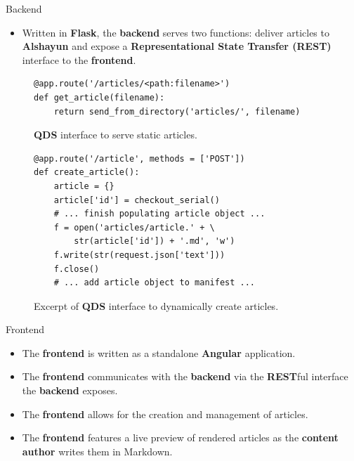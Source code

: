 \documentclass{beamer}
\begin{document}
\begin{frame}{Backend}
    \begin{itemize}
        \item Written in \textbf{Flask}, the \textbf{backend} serves two
            functions: deliver articles to \textbf{Alshayun} and expose a
            \textbf{Representational State Transfer (REST)} interface to the
            \textbf{frontend}.
    \end{itemize}
    \begin{figure}
    \begin{verbatim}
@app.route('/articles/<path:filename>')
def get_article(filename):
    return send_from_directory('articles/', filename)
    \end{verbatim}
    \caption{\textbf{QDS} interface to serve static articles.}
    \end{figure}
    \begin{figure}
    \begin{verbatim}
@app.route('/article', methods = ['POST'])
def create_article():
    article = {}
    article['id'] = checkout_serial()
    # ... finish populating article object ...
    f = open('articles/article.' + \
        str(article['id']) + '.md', 'w')
    f.write(str(request.json['text']))
    f.close()
    # ... add article object to manifest ...
    \end{verbatim}
    \caption{Excerpt of \textbf{QDS} interface to dynamically create articles.}
    \end{figure}
\end{frame}

\begin{frame}{Frontend}
    \begin{itemize}
        \item The \textbf{frontend} is written as a standalone \textbf{Angular}
            application.
        \item The \textbf{frontend} communicates with the \textbf{backend} via
            the \textbf{REST}ful interface the \textbf{backend} exposes.
        \item The \textbf{frontend} allows for the creation and management of
            articles.
        \item The \textbf{frontend} features a live preview of rendered articles
            as the \textbf{content author} writes them in Markdown.
    \end{itemize}
\end{frame}
\end{document}
